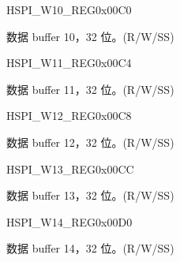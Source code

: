 \begin{register}{H}{SPI\_W10\_REG}{0x00C0}\label{regdesc:SPIW10REG}
%
\regnewline%
\begin{regdesc}\begin{reglist}
\label{fielddesc:SPIBUF10}\item [SPI\_BUF10] 数据 buffer 10，32 位。(R/W/SS)
\end{reglist}\end{regdesc}
\end{register}


\begin{register}{H}{SPI\_W11\_REG}{0x00C4}\label{regdesc:SPIW11REG}
%
\regnewline%
\begin{regdesc}\begin{reglist}
\label{fielddesc:SPIBUF11}\item [SPI\_BUF11] 数据 buffer 11，32 位。(R/W/SS)
\end{reglist}\end{regdesc}
\end{register}


\begin{register}{H}{SPI\_W12\_REG}{0x00C8}\label{regdesc:SPIW12REG}
%
\regnewline%
\begin{regdesc}\begin{reglist}
\label{fielddesc:SPIBUF12}\item [SPI\_BUF12] 数据 buffer 12，32 位。(R/W/SS)
\end{reglist}\end{regdesc}
\end{register}


\begin{register}{H}{SPI\_W13\_REG}{0x00CC}\label{regdesc:SPIW13REG}
%
\regnewline%
\begin{regdesc}\begin{reglist}
\label{fielddesc:SPIBUF13}\item [SPI\_BUF13] 数据 buffer 13，32 位。(R/W/SS)
\end{reglist}\end{regdesc}
\end{register}


\begin{register}{H}{SPI\_W14\_REG}{0x00D0}\label{regdesc:SPIW14REG}
%
\regnewline%
\begin{regdesc}\begin{reglist}
\label{fielddesc:SPIBUF14}\item [SPI\_BUF14] 数据 buffer 14，32 位。(R/W/SS)
\end{reglist}\end{regdesc}
\end{register}


